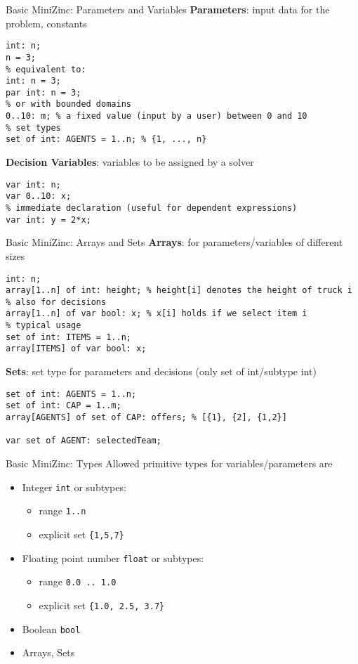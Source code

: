 \begin{frame}[fragile]{Basic MiniZinc: Parameters and Variables}
\textbf{Parameters}: input data for the problem, constants 
\begin{lstlisting}
int: n; 
n = 3; 
% equivalent to: 
int: n = 3; 
par int: n = 3; 
% or with bounded domains
0..10: m; % a fixed value (input by a user) between 0 and 10
% set types 
set of int: AGENTS = 1..n; % {1, ..., n}
\end{lstlisting}
\pause 

\vspace*{2ex}

\textbf{Decision Variables}: variables to be assigned by a solver
\begin{lstlisting}
var int: n; 
var 0..10: x;
% immediate declaration (useful for dependent expressions)
var int: y = 2*x; 
\end{lstlisting}
\end{frame}

\begin{frame}[fragile]{Basic MiniZinc: Arrays and Sets}
\textbf{Arrays}: for parameters/variables of different sizes 
\begin{lstlisting}
int: n;
array[1..n] of int: height; % height[i] denotes the height of truck i
% also for decisions 
array[1..n] of var bool: x; % x[i] holds if we select item i 
% typical usage 
set of int: ITEMS = 1..n;
array[ITEMS] of var bool: x;
\end{lstlisting}
\pause 

\vspace*{2ex}

\textbf{Sets}: set type for parameters and decisions (only set of int/subtype int)
\begin{lstlisting}
set of int: AGENTS = 1..n;
set of int: CAP = 1..m; 
array[AGENTS] of set of CAP: offers; % [{1}, {2], {1,2}]

var set of AGENT: selectedTeam;
\end{lstlisting}
\end{frame}

\begin{frame}[fragile]{Basic MiniZinc: Types}
Allowed primitive types for variables/parameters are
\begin{itemize}
\item Integer \texttt{int} or subtypes:
\begin{itemize}
\item range \texttt{1..n}
\item explicit set \texttt{\{1,5,7\}}
\end{itemize}  
\item Floating point number \texttt{float} or subtypes:
\begin{itemize}
\item range \texttt{0.0 .. 1.0}
\item explicit set \texttt{\{1.0, 2.5, 3.7\}}
\end{itemize}
\item Boolean \texttt{bool}  
\item Arrays, Sets
\end{itemize}
\end{frame}

